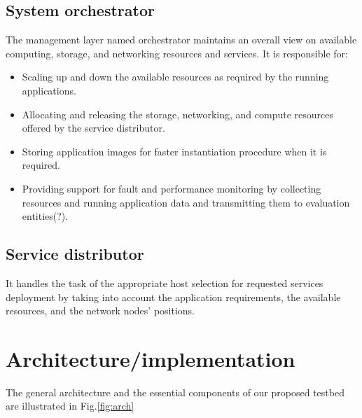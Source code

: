 \documentclass[conference]{IEEEtran}
\begin{document}
\subsection{System orchestrator}
\par The management layer named orchestrator maintains an overall view on available computing, storage, and networking resources and services. It is responsible for:
\begin{itemize}
\item Scaling up and down the available resources as required by the running applications. 
\item Allocating and releasing the storage, networking, and compute resources offered by the service distributor.
\item Storing application images for faster instantiation procedure when it is required.
\item Providing support for fault and performance monitoring by collecting resources and running application
data and transmitting them to evaluation entities(?).
\end{itemize}
\subsection{Service distributor}
\par It handles the task of the appropriate host selection for requested services deployment by taking into account the application requirements, the available resources, and the network nodes' positions.

\section{Architecture/implementation}
\par The general architecture and the essential components of our proposed testbed are illustrated
in Fig.\ref{fig:arch} 
\end{document}
